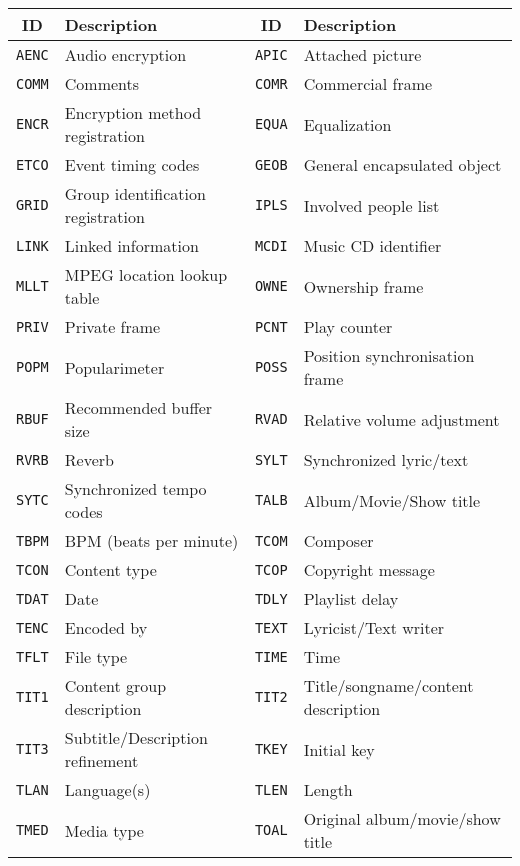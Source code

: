 \begin{table}[h]
{
\begin{tabular}{|c|l||c|l|}
\hline
ID & Description & ID & Description \\
\hline
\texttt{AENC} & Audio encryption & \texttt{APIC} & Attached picture \\
\texttt{COMM} & Comments & \texttt{COMR} & Commercial frame \\
\texttt{ENCR} & Encryption method registration & \texttt{EQUA} & Equalization \\
\texttt{ETCO} & Event timing codes & \texttt{GEOB} & General encapsulated object \\
\texttt{GRID} & Group identification registration & \texttt{IPLS} & Involved people list \\
\texttt{LINK} & Linked information & \texttt{MCDI} & Music CD identifier \\
\texttt{MLLT} & MPEG location lookup table & \texttt{OWNE} & Ownership frame \\
\texttt{PRIV} & Private frame & \texttt{PCNT} & Play counter \\
\texttt{POPM} & Popularimeter & \texttt{POSS} & Position synchronisation frame \\
\texttt{RBUF} & Recommended buffer size & \texttt{RVAD} & Relative volume adjustment \\
\texttt{RVRB} & Reverb & \texttt{SYLT} & Synchronized lyric/text \\
\texttt{SYTC} & Synchronized tempo codes & \texttt{TALB} & Album/Movie/Show title \\
\texttt{TBPM} & BPM (beats per minute) & \texttt{TCOM} & Composer \\
\texttt{TCON} & Content type & \texttt{TCOP} & Copyright message \\
\texttt{TDAT} & Date & \texttt{TDLY} & Playlist delay \\
\texttt{TENC} & Encoded by & \texttt{TEXT} & Lyricist/Text writer \\
\texttt{TFLT} & File type & \texttt{TIME} & Time \\
\texttt{TIT1} & Content group description & \texttt{TIT2} & Title/songname/content description \\
\texttt{TIT3} & Subtitle/Description refinement & \texttt{TKEY} & Initial key \\
\texttt{TLAN} & Language(s) & \texttt{TLEN} & Length \\
\texttt{TMED} & Media type & \texttt{TOAL} & Original album/movie/show title \\

\end{tabular}}
\end{table}
